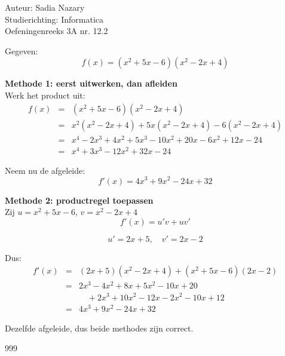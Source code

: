 \documentclass[a4paper]{article}
\begin{document}
\noindent \large Auteur: Sadia Nazary \\
\noindent \large Studierichting: Informatica \\
\noindent \large Oefeningenreeks 3A nr. 12.2 \\

\medskip

\normalsize

 Gegeven: \\

$$f(x) = (x^2 + 5x - 6)(x^2 - 2x + 4)$$

 \textbf{Methode 1: eerst uitwerken, dan afleiden} \\

 Werk het product uit: \\

\begin{eqnarray*}
f(x) &=& (x^2 + 5x - 6)(x^2 - 2x + 4) \\
&=& x^2(x^2 - 2x + 4) + 5x(x^2 - 2x + 4) - 6(x^2 - 2x + 4) \\
&=& x^4 - 2x^3 + 4x^2 + 5x^3 - 10x^2 + 20x - 6x^2 + 12x - 24 \\
&=& x^4 + 3x^3 - 12x^2 + 32x - 24
\end{eqnarray*}

 Neem nu de afgeleide: \\

$$f'(x) = 4x^3 + 9x^2 - 24x + 32$$

 \textbf{Methode 2: productregel toepassen} \\

 Zij $u = x^2 + 5x - 6$, $v = x^2 - 2x + 4$ \\

$$f'(x) = u'v + uv'$$

$$u' = 2x + 5, \quad v' = 2x - 2$$

 Dus: \\

\begin{eqnarray*}
f'(x) &=& (2x + 5)(x^2 - 2x + 4) + (x^2 + 5x - 6)(2x - 2) \\
&=& 2x^3 - 4x^2 + 8x + 5x^2 - 10x + 20 \\
&&\quad + 2x^3 + 10x^2 - 12x - 2x^2 - 10x + 12 \\
&=& 4x^3 + 9x^2 - 24x + 32
\end{eqnarray*}

 Dezelfde afgeleide, dus beide methodes zijn correct. \\

\begin{thebibliography}{999}
\end{thebibliography}
\end{document}
